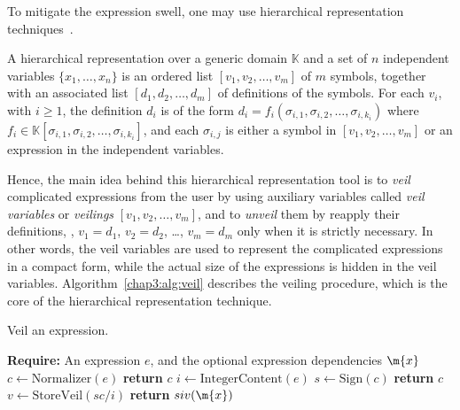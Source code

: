 To mitigate the expression swell, one may use hierarchical representation techniques~\cite{carette2006linear, zhou2006hierarchical}.
%
\begin{definition}
  A hierarchical representation over a generic domain $\mathbb{K}$ and a set of $n$ independent variables $\{x_1, \dots, x_n\}$ is an ordered list $[v_1, v_2, \dots, v_m]$ of $m$ symbols, together with an associated list $[d_1, d_2, \dots, d_m]$ of definitions of the symbols. For each $v_i$, with $i \geq 1$, the definition $d_i$ is of the form $d_i = f_i(\sigma_{i,1}, \sigma_{i,2}, \dots, \sigma_{i,k_i})$ where $f_i \in \mathbb{K}[\sigma_{i,1}, \sigma_{i,2}, \dots, \sigma_{i,k_i}]$, and each $\sigma_{i,j}$ is either a symbol in $[v_1, v_2, \dots, v_m]$ or an expression in the independent variables.
\end{definition}
%
Hence, the main idea behind this hierarchical representation tool is to \emph{veil} complicated expressions from the user by using auxiliary variables called \emph{veil variables} or \emph{veilings} $[v_1, v_2, \dots, v_m]$, and to \emph{unveil} them by reapply their definitions, \ie{}, $v_1 = d_1$, $v_2 = d_2$, \dots, $v_m = d_m$ only when it is strictly necessary. In other words, the veil variables are used to represent the complicated expressions in a compact form, while the actual size of the expressions is hidden in the veil variables. Algorithm~\ref{chap3:alg:veil} describes the veiling procedure, which is the core of the hierarchical representation technique.

\begin{breakablealgorithm}
  \caption{Veil an expression.}
  \label{chap3:alg:veil}
  \begin{algorithmic}[1]
    \State \textbf{Require:} An expression $e$, and the optional expression dependencies $\m{x}$
     
    \State $c \gets \mathrm{Normalizer}(e)$ 
     
      \State \textbf{return} $c$ 
    \EndIf
    \State $i \gets \mathrm{IntegerContent}(e)$ 
    \State $s \gets \mathrm{Sign}(c)$ 
     
      \State \textbf{return} $c$ 
    \Else
      \State $v \gets \mathrm{StoreVeil}(sc/i)$ 
      \State \textbf{return} $siv(\m{x})$ 
    \EndIf
    \EndProcedure
  \end{algorithmic}
\end{breakablealgorithm}

